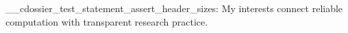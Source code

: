 \documentclass[type=interest]{careerdossier-statement}
\begin{document}
\MakeCDossierStatementHeader
\ExplSyntaxOn
\__cdossier_test_statement_assert_header_sizes:
\ExplSyntaxOff
My interests connect reliable computation with transparent research practice.
\end{document}
